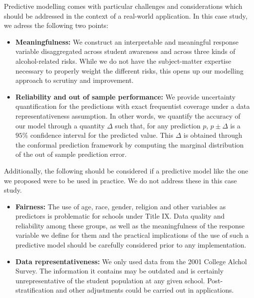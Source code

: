 \documentclass[10pt]{jmlr}%
\begin{document}
Predictive modelling comes with particular challenges and considerations which should be addressed in the context of a real-world application. In this case study, we adress the following two points:

\begin{itemize}
\item \textbf{Meaningfulness:} We construct an interpretable and meaningful response variable disaggregated across student awareness and across three kinds of alcohol-related risks. While we do not have the subject-matter expertise necessary to properly weight the different risks, this opens up our modelling approach to scrutiny and improvement.
\item \textbf{Reliability and out of sample performance:} We provide uncertainty quantification for the predictions with exact frequentist coverage under a data representativeness assumption. In other words, we quantify the accuracy of our model through a quantity $\Delta$ such that, for any prediction $p$, $p \pm \Delta$ is a $95\%$ confidence interval for the predicted value. This $\Delta$ is obtained through the conformal prediction framework by computing the marginal distribution of the out of sample prediction error. 
\end{itemize}


Additionally, the following should be considered if a predictive model like the one we proposed were to be used in practice. We do not address these in this case study.

\begin{itemize}
\item \textbf{Fairness:} The use of age, race, gender, religion and other variables as predictors is problematic for schools under Title IX. Data quality and reliability among these groups, as well as the meaningfulness of the response variable we define for them and the practical implications of the use of such a predictive model should be carefully considered prior to any implementation.
\item \textbf{Data representativeness:} We only used data from the 2001 College Alchol Survey. The information it contains may be outdated and is certainly unrepresentative of the student population at any given school. Post-stratification and other adjustments could be carried out in applications.
\end{itemize}



\end{document}
